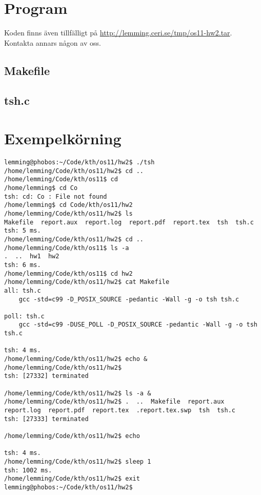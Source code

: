 \documentclass[a4paper,11pt]{article}
\begin{document}
\section*{Program}

Koden finns även tillfälligt på \url{http://lemming.ceri.se/tmp/os11-hw2.tar}. Kontakta annars någon av oss.

\subsection*{Makefile}


\subsection*{tsh.c}


\section*{Exempelkörning}

\begin{lstlisting}
lemming@phobos:~/Code/kth/os11/hw2$ ./tsh 
/home/lemming/Code/kth/os11/hw2$ cd ..
/home/lemming/Code/kth/os11$ cd 
/home/lemming$ cd Co	
tsh: cd: Co	: File not found
/home/lemming$ cd Code/kth/os11/hw2
/home/lemming/Code/kth/os11/hw2$ ls
Makefile  report.aux  report.log  report.pdf  report.tex  tsh  tsh.c
tsh: 5 ms.
/home/lemming/Code/kth/os11/hw2$ cd ..
/home/lemming/Code/kth/os11$ ls -a
.  ..  hw1  hw2
tsh: 6 ms.
/home/lemming/Code/kth/os11$ cd hw2
/home/lemming/Code/kth/os11/hw2$ cat Makefile
all: tsh.c
	gcc -std=c99 -D_POSIX_SOURCE -pedantic -Wall -g -o tsh tsh.c

poll: tsh.c
	gcc -std=c99 -DUSE_POLL -D_POSIX_SOURCE -pedantic -Wall -g -o tsh tsh.c

tsh: 4 ms.
/home/lemming/Code/kth/os11/hw2$ echo &
/home/lemming/Code/kth/os11/hw2$ 
tsh: [27332] terminated

/home/lemming/Code/kth/os11/hw2$ ls -a &
/home/lemming/Code/kth/os11/hw2$ .  ..  Makefile  report.aux  report.log  report.pdf  report.tex  .report.tex.swp  tsh  tsh.c
tsh: [27333] terminated

/home/lemming/Code/kth/os11/hw2$ echo

tsh: 4 ms.
/home/lemming/Code/kth/os11/hw2$ sleep 1
tsh: 1002 ms.
/home/lemming/Code/kth/os11/hw2$ exit
lemming@phobos:~/Code/kth/os11/hw2$ 
\end{lstlisting}
\end{document}
